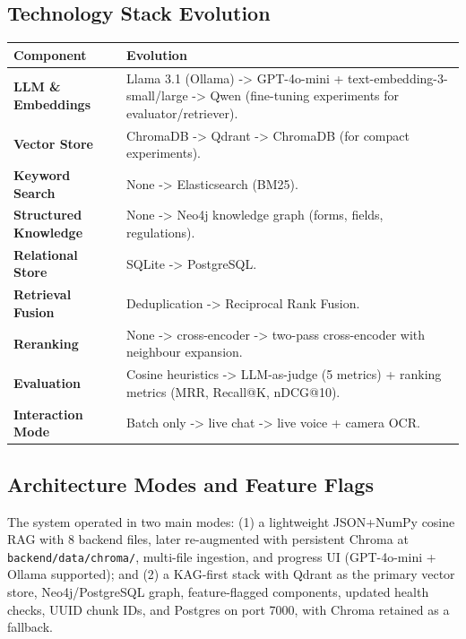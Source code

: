\documentclass[11pt,a4paper]{article}
\begin{document}
\subsection{Technology Stack Evolution}
\begin{longtable}{@{}>{\bfseries}p{}p{}@{}}
\toprule
Component & Evolution \\
\midrule
LLM \& Embeddings & Llama 3.1 (Ollama) -> GPT-4o-mini + text-embedding-3-small/large -> Qwen (fine-tuning experiments for evaluator/retriever). \\
Vector Store & ChromaDB -> Qdrant -> ChromaDB (for compact experiments). \\
Keyword Search & None -> Elasticsearch (BM25). \\
Structured Knowledge & None -> Neo4j knowledge graph (forms, fields, regulations). \\
Relational Store & SQLite -> PostgreSQL. \\
Retrieval Fusion & Deduplication -> Reciprocal Rank Fusion. \\
Reranking & None -> cross-encoder -> two-pass cross-encoder with neighbour expansion. \\
Evaluation & Cosine heuristics -> LLM-as-judge (5 metrics) + ranking metrics (MRR, Recall@K, nDCG@10). \\
Interaction Mode & Batch only -> live chat -> live voice + camera OCR. \\
\bottomrule
\end{longtable}

\subsection{Architecture Modes and Feature Flags}
The system operated in two main modes: (1) a lightweight JSON+NumPy cosine RAG with 8 backend files, later re-augmented with persistent Chroma at \texttt{backend/data/chroma/}, multi-file ingestion, and progress UI (GPT-4o-mini + Ollama supported); and (2) a KAG-first stack with Qdrant as the primary vector store, Neo4j/PostgreSQL graph, feature-flagged components, updated health checks, UUID chunk IDs, and Postgres on port 7000, with Chroma retained as a fallback.
\end{document}
